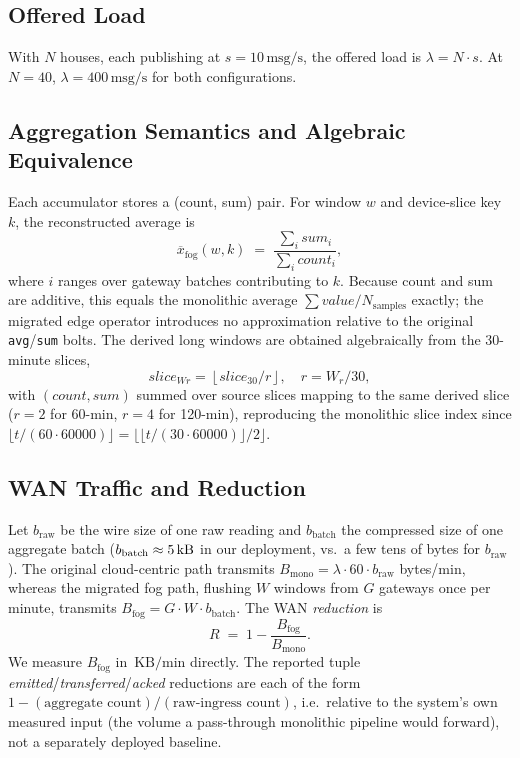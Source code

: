 \documentclass[conference]{IEEEtran}
\newcommand{\msgps}{\,\text{msg/s}}
\newcommand{\KBmin}{\,\text{KB/min}}
\newcommand{\code}[1]{\texttt{#1}}
\begin{document}
\subsection{Offered Load}
With $N$ houses, each publishing at $s=10\msgps$, the offered load is
$\lambda = N \cdot s$. At $N=40$, $\lambda=400\msgps$ for both configurations.

\subsection{Aggregation Semantics and Algebraic Equivalence}
Each accumulator stores a (count, sum) pair. For window $w$ and device-slice key
$k$, the reconstructed average is
\begin{equation}
\overline{x}_{\text{fog}}(w,k)
 \;=\; \frac{\sum_{i} \textit{sum}_i}{\sum_{i} \textit{count}_i},
\label{eq:fogavg}
\end{equation}
where $i$ ranges over gateway batches contributing to $k$. Because count and sum
are additive, this equals the monolithic average
$\sum \textit{value}/N_{\text{samples}}$ exactly; the migrated edge operator
introduces no approximation relative to the original \code{avg}/\code{sum} bolts.
The derived long windows are obtained algebraically from the 30-minute slices,
\begin{equation}
\textit{slice}_{Wr} = \left\lfloor \textit{slice}_{30}/r \right\rfloor,\quad
r=W_r/30,
\label{eq:derive}
\end{equation}
with $(count,sum)$ summed over source slices mapping to the same derived slice
($r=2$ for 60-min, $r=4$ for 120-min), reproducing the monolithic slice index
since $\lfloor t/(60\!\cdot\!60000)\rfloor=\lfloor\lfloor t/(30\!\cdot\!60000)\rfloor/2\rfloor$.

\subsection{WAN Traffic and Reduction}
Let $b_{\text{raw}}$ be the wire size of one raw reading and $b_{\text{batch}}$
the compressed size of one aggregate batch ($b_{\text{batch}}\approx\SI{5}{\kilo\byte}$
in our deployment, vs.\ a few tens of bytes for $b_{\text{raw}}$). The original
cloud-centric path transmits $B_{\text{mono}} = \lambda \cdot 60 \cdot b_{\text{raw}}$
bytes/min, whereas the migrated fog path, flushing $W$ windows from $G$ gateways
once per minute, transmits $B_{\text{fog}} = G \cdot W \cdot b_{\text{batch}}$.
The WAN \emph{reduction} is
\begin{equation}
R \;=\; 1 - \frac{B_{\text{fog}}}{B_{\text{mono}}}.
\label{eq:wanred}
\end{equation}
We measure $B_{\text{fog}}$ in $\KBmin$ directly. The reported tuple
\emph{emitted}/\emph{transferred}/\emph{acked} reductions are each of the form
$1-(\text{aggregate count})/(\text{raw-ingress count})$, i.e.\ relative to the
system's own measured input (the volume a pass-through monolithic pipeline would
forward), not a separately deployed baseline.
\end{document}
